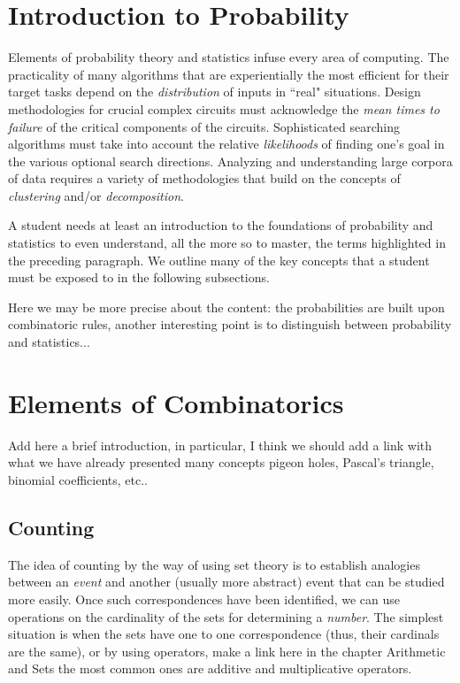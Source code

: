 \section{Introduction to Probability}
\label{sec:prob-stat}


Elements of probability theory and statistics infuse every area of
computing.  The practicality of many algorithms that are
experientially the most efficient for their target tasks depend on the
{\em distribution} of inputs in ``real" situations.  Design
methodologies for crucial complex circuits must acknowledge the {\em
  mean times to failure} of the critical components of the circuits.
Sophisticated searching algorithms must take into account the relative
{\em likelihoods} of finding one's goal in the various optional search
directions.  Analyzing and understanding large corpora of data
requires a variety of methodologies that build on the concepts of {\em
  clustering} and/or {\em decomposition}.

A student needs at least an introduction to the foundations of
probability and statistics to even understand, all the more so to
master, the terms highlighted in the preceding paragraph.  We outline
many of the key concepts that a student must be exposed to in the
following subsections.

{\Denis Here we may be more precise about the content: the probabilities are built upon combinatoric rules, another interesting point is to distinguish between probability and statistics...}


\section{Elements of Combinatorics}

Add here a brief introduction,
in particular, I think we should add a link with what we have already presented many concepts pigeon holes, 
Pascal's triangle, binomial coefficients, etc..


\subsection{Counting}

The idea of counting by the way of using set theory is to establish analogies between an \textit{event}
and another (usually more abstract) event that can be studied more easily. 
Once such correspondences have been identified, we can use operations on the cardinality of the sets
for determining a \textit{number}.
The simplest situation is when the sets have one to one correspondence (thus, their cardinals are the same), or
by using operators,
{\Denis  make a link here in the chapter Arithmetic and Sets}
the most common ones are additive and multiplicative operators.

